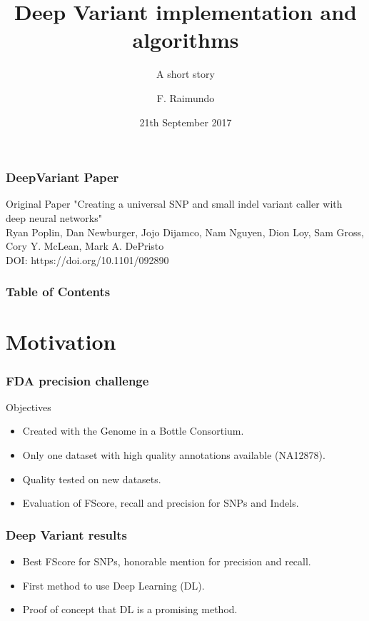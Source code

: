 \documentclass{beamer}
\title[Deep Variant] %
{Deep Variant implementation and algorithms}
\subtitle{A short story}
\author[Raimundo] %
{F. Raimundo\inst{1}}
\institute[] %
{
  \inst{1}%
  CEDAR\\
  École Polytechnique
}
\date[] %
{21th September 2017}
\begin{document}
\frame{\titlepage}

\begin{frame}
\frametitle{DeepVariant Paper}

\begin{block}{Original Paper}
"Creating a universal SNP and small indel variant caller with deep neural networks"\\
Ryan Poplin, Dan Newburger, Jojo Dijamco, Nam Nguyen, Dion Loy, Sam Gross, Cory Y. McLean,
Mark A. DePristo\\
DOI: https://doi.org/10.1101/092890
\end{block}

\end{frame}

\begin{frame}
\frametitle{Table of Contents}
\tableofcontents
\end{frame}

\section{Motivation}

\begin{frame}
    \frametitle{FDA precision challenge}

    Objectives
    \begin{itemize}
        \item Created with the Genome in a Bottle Consortium.
        \item Only one dataset with high quality annotations available (NA12878).
        \item Quality tested on new datasets.
        \item Evaluation of FScore, recall and precision for SNPs and Indels.
    \end{itemize}

\end{frame}

\begin{frame}
    \frametitle{Deep Variant results}

    \begin{itemize}
        \item Best FScore for SNPs, honorable mention for precision and recall.
        \item First method to use Deep Learning (DL).
        \item Proof of concept that DL is a promising method.
    \end{itemize}
\end{frame}
\end{document}
